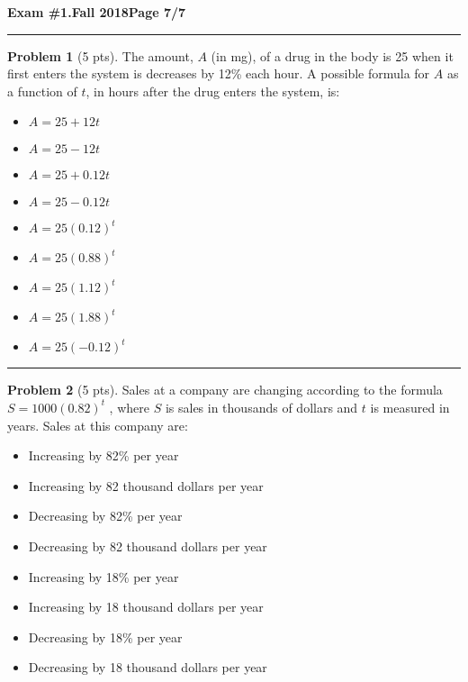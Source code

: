 \documentclass[12pt]{article}
\makeatletter
\theoremstyle{definition}
\newtheorem{problem}{Problem}
\newcommand*{\radiobutton}{%
  \@ifstar{\@radiobutton0}{\@radiobutton1}%
}
\newcommand*{\@radiobutton}[1]{%
  \begin{tikzpicture}
    \pgfmathsetlengthmacro\radius{height("X")/2}
    \draw[radius=\radius] circle;
    \ifcase#1 \fill[radius=.6*\radius] circle;\fi
  \end{tikzpicture}%
}
\makeatother
\begin{document}
\newpage 


\hfill{\large\bf Exam \#1.}\hfill{\large\bf  Fall 2018}\hfill{\large\bf Page 7/7}\hrule

\bigskip
\begin{problem}[5 pts]
   The amount, $A$ (in mg), of a drug in the body is 25 when it first enters the system is decreases by 12\% each hour. A
  possible formula for $A$ as a function of $t$, in hours after the drug enters the system, is: 
  \begin{itemize}
  \item[\radiobutton] $A= 25+12t$
  \item[\radiobutton] $A=25-12t$
  \item[\radiobutton] $A=25+0.12t$
  \item[\radiobutton] $A=25-0.12t$
  \item[\radiobutton] $A=25(0.12)^t$
  \item[\radiobutton] $A=25(0.88)^t$
  \item[\radiobutton] $A=25(1.12)^t$
  \item[\radiobutton] $A=25(1.88)^t$
  \item[\radiobutton] $A=25(-0.12)^t$
  \end{itemize}
\end{problem}
\hrule

\begin{problem}[5 pts]
  Sales at a company are changing according to the formula $S = 1000 (0.82)^t$ , where $S$ is sales in thousands of
  dollars and $t$ is measured in years. Sales at this company are: 
  \begin{itemize}
  \item[\radiobutton] Increasing by 82\% per year
  \item[\radiobutton] Increasing by 82 thousand dollars per year
  \item[\radiobutton] Decreasing by 82\% per year
  \item[\radiobutton] Decreasing by 82 thousand dollars per year
  \item[\radiobutton] Increasing by 18\% per year
  \item[\radiobutton] Increasing by 18 thousand dollars per year
  \item[\radiobutton] Decreasing by 18\% per year
  \item[\radiobutton] Decreasing by 18 thousand dollars per year
  \end{itemize} 
\end{problem}
\end{document}
